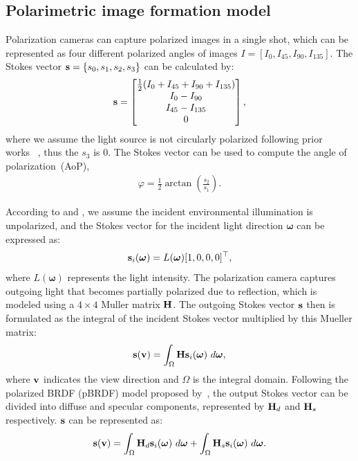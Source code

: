 \subsection{Polarimetric image formation model}
\label{sec:polar image formation}
Polarization cameras can capture polarized images in a single shot, 
which can be represented as four different polarized angles of images 
$I=[I_0,I_{45},I_{90},I_{135}]$. 
The Stokes vector $\mathbf{s} = \{s_0,s_1,s_2,s_3\}$ can be calculated by:
\begin{equation}
    \mathbf{s} = \begin{bmatrix}\frac{1}{2}
        (I_0+I_{45}+I_{90}+I_{135})\\
        I_{0}-I_{90}\\
        I_{45}-I_{135}\\
        0
    \end{bmatrix},
\end{equation}
where we assume the light source is not circularly polarized following prior works~
\citep{dave2022pandora,han2024nersp},
thus the $s_3$ is 0. The Stokes vector can be used to compute the angle of polarization~(AoP), \ie
\begin{eqnarray}
	\varphi = \frac{1}{2}\arctan(\frac{s_2}{s_1}).
\end{eqnarray}


According to \pandora and \nersp, we assume the incident environmental illumination is unpolarized, and the Stokes vector for the incident light direction $\bm{\omega}$ can be expressed as:
\begin{equation}
    \mathbf{s}_i(\bm{\omega}) = L(\bm{\omega}) [1, 0, 0, 0]^\top,
    \label{eq:env_stok}
\end{equation}
where $L(\bm{\omega})$ represents the light intensity. The polarization camera captures outgoing light that becomes partially polarized due to 
reflection, which is modeled using a $4 \times 4$ Muller matrix $\mathbf{H}$. 
The outgoing Stokes vector $\mathbf{s}$ then is formulated as the integral of the incident Stokes vector multiplied by this Mueller matrix:
\begin{equation}
    \mathbf{s}(\mathbf{v}) = \int_{\Omega} \mathbf{H} \mathbf{s}_i(\bm{\omega}) \,\, d\bm{\omega},
    \label{eq:out_stok}
\end{equation}
where $\mathbf{v}$ indicates the view direction and $\Omega$ is the integral domain. 
Following the polarized BRDF (pBRDF) model proposed by~\cite{baek2018simultaneous}, the output Stokes vector can be divided into diffuse and specular components, 
represented by $\mathbf{H}_d$ and $\mathbf{H}_s$ respectively. $\mathbf{s}$ 
can be represented as:
\begin{equation}
    \mathbf{s}(\mathbf{v}) = \int_{\Omega} \mathbf{H}_d \mathbf{s}_i(\bm{\omega}) \,\, d\bm{\omega} + \int_{\Omega} \mathbf{H}_s \mathbf{s}_i(\bm{\omega}) \,\, d\bm{\omega}.
    \label{eq:decomp_stok}
\end{equation}

